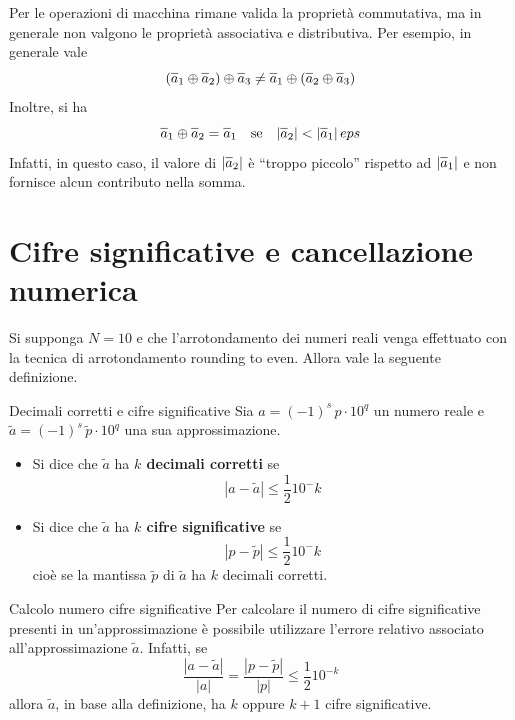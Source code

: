 Per le operazioni di macchina rimane valida la proprietà commutativa, ma in generale non valgono le
proprietà associativa e distributiva. Per esempio, in generale vale
\[(\overline{a\vphantom{\rule{0pt}{1.2ex}}}_1\oplus\overline{a\vphantom{\rule{0pt}{1.2ex}}}_2)\oplus
\overline{a\vphantom{\rule{0pt}{1.2ex}}}_3\ne\overline{a\vphantom{\rule{0pt}{1.2ex}}}_1\oplus
(\overline{a\vphantom{\rule{0pt}{1.2ex}}}_2\oplus\overline{a\vphantom{\rule{0pt}{1.2ex}}}_3)\]
Inoltre, si ha
\[\overline{a\vphantom{\rule{0pt}{1.2ex}}}_1\oplus\overline{a\vphantom{\rule{0pt}{1.2ex}}}_2=
\overline{a\vphantom{\rule{0pt}{1.2ex}}}_1\quad\text{se}\quad|\overline{a\vphantom{\rule{0pt}{1.2ex}}}_2|
<|\overline{a\vphantom{\rule{0pt}{1.2ex}}}_1|\,eps\]
Infatti, in questo caso, il valore di $|\overline{a\vphantom{\rule{0pt}{1.2ex}}}_2|$ è
``troppo piccolo'' rispetto ad $|\overline{a\vphantom{\rule{0pt}{1.2ex}}}_1|$ e non fornisce alcun
contributo nella somma.

\section{Cifre significative e cancellazione numerica}

Si supponga $N=10$ e che l'arrotondamento dei numeri reali venga effettuato con la tecnica di
arrotondamento rounding to even. Allora vale la seguente definizione.
\begin{definition}{Decimali corretti e cifre significative}
    Sia $a=\left(-1\right)^s\,p\cdot10^q$ un numero reale e $\tilde{a}=\left(-1\right)^s\,\tilde{p}\cdot10^q$ una sua
    approssimazione.
    \begin{itemize}
        \item Si dice che $\tilde{a}$ ha \textbf{$k$ decimali corretti} se
        \[|a-\tilde{a}|\leq\frac1210^-k\]
        \item Si dice che $\tilde{a}$ ha \textbf{$k$ cifre significative} se
        \[|p-\tilde{p}|\leq\frac1210^-k\]
        cioè se la mantissa $\tilde{p}$ di $\tilde{a}$ ha $k$ decimali corretti.
    \end{itemize}
\end{definition}

\begin{observation}{Calcolo numero cifre significative}
    Per calcolare il numero di cifre significative presenti in un'approssimazione è possibile
    utilizzare l'errore relativo associato all'approssimazione $\tilde{a}$. Infatti, se
    \[\frac{|a-\tilde{a}|}{|a|}=\frac{|p-\tilde{p}|}{|p|}\leq\frac1210^{-k}\]
    allora $\tilde{a}$, in base alla definizione, ha $k$ oppure $k+1$ cifre significative.
\end{observation}

